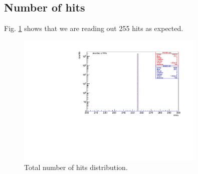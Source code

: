 \subsection{Number of hits}
 Fig. \ref{fig:3} shows that we are reading out 255 hits as expected.
\begin{figure}[!h]
\centering
\includegraphics[width =0.8\textwidth]{figures/pdf/figure_00008_nhits_281}
\caption{Total number of hits distribution.}
\label{fig:3}
\end{figure}


